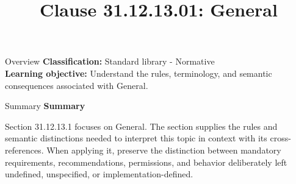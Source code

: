 \documentclass[10pt,letterpaper]{article}
\title{Clause 31.12.13.01: General}
\author{}
\date{}
\begin{document}
\maketitle
\begin{CornellOverviewBox}{Overview}
\textbf{Classification:} Standard library - Normative\\[2pt]
\textbf{Learning objective:} Understand the rules, terminology, and semantic consequences associated with General.
\end{CornellOverviewBox}\begin{CornellSummaryBox}{Summary}
{\sffamily\bfseries\color{Accent} Summary}\par\vspace{3pt}Section 31.12.13.1 focuses on General. The section supplies the rules and semantic distinctions needed to interpret this topic in context with its cross-references. When applying it, preserve the distinction between mandatory requirements, recommendations, permissions, and behavior deliberately left undefined, unspecified, or implementation-defined.
\end{CornellSummaryBox}
\end{document}
